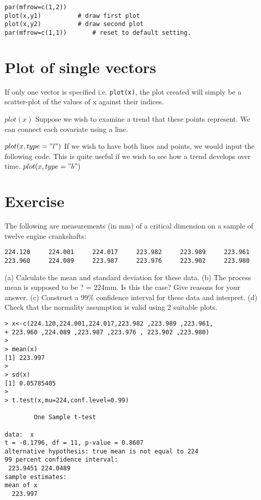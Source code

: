 \documentclass[a4paper,12pt]{article}
\begin{document}
\begin{itemize}
\begin{verbatim}
par(mfrow=c(1,2))
plot(x,y1)			# draw first plot
plot(x,y2)			# draw second plot
par(mfrow=c(1,1))		# reset to default setting.
\end{verbatim}

\section{Plot of single vectors}
If only one vector is specified i.e. \texttt{plot(x)},  the plot created will simply be a scatter-plot of the values of x against their indices.

$plot(x)$
Suppose we wish to examine a trend that these points represent. We can connect each covariate using a line.

$plot(x, type = "l")$
If we wish to have both lines and points, we would input the following code. This is quite useful if we wish to see how a trend develops over time.
$plot(x, type = "b")$









\section{Exercise} The following are measurements (in mm) of a critical
dimension on a sample of twelve engine crankshafts:

\begin{verbatim}
224.120 	224.001 	224.017 	223.982 	223.989 	223.961
223.960 	224.089 	223.987 	223.976 	223.902 	223.980
\end{verbatim}
(a) Calculate the mean and standard deviation for these data.
(b) The process mean is supposed to be ? = 224mm. Is this the
case? Give reasons for your answer.
(c) Construct a 99\% confidence interval for these data and interpret.
(d) Check that the normality assumption is valid using 2 suitable plots.

\begin{verbatim}
> x<-c(224.120,224.001,224.017,223.982 ,223.989 ,223.961,
+ 223.960 ,224.089 ,223.987 ,223.976 , 223.902 ,223.980)
>
> mean(x)
[1] 223.997
>
> sd(x)
[1] 0.05785405
>
> t.test(x,mu=224,conf.level=0.99)

        One Sample t-test

data:  x
t = -0.1796, df = 11, p-value = 0.8607
alternative hypothesis: true mean is not equal to 224
99 percent confidence interval:
 223.9451 224.0489
sample estimates:
mean of x
  223.997


\end{verbatim}
\end{itemize}
\end{document}
